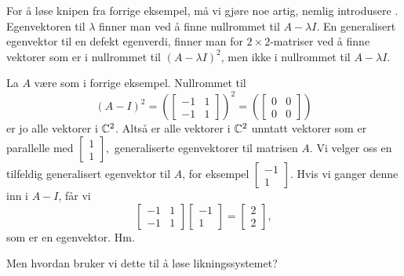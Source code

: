 For å løse knipen fra forrige eksempel, må vi gjøre noe artig, nemlig introdusere . 
Egenvektoren til $\lambda$ finner man ved å finne nullrommet til $A-\lambda I$. 
En generalisert egenvektor til en defekt egenverdi, finner man for $2 \times 2$-matriser ved å finne vektorer som er i nullrommet til $(A-\lambda I)^2$, 
men ikke i nullrommet til $A-\lambda I$.

\begin{ex}
La $A$ være som i forrige eksempel. Nullrommet til 
\[
(A-I)^2=
\left(\begin{bmatrix}
-1 & 1   \\
-1 & 1
\end{bmatrix}\right)^2=
\left(\begin{bmatrix}
0 & 0   \\
0 & 0
\end{bmatrix}\right)
\]
er jo alle vektorer i $\mathbb{C}^2$. Altså er alle vektorer i $\mathbb{C}^2$ unntatt vektorer som er parallelle med 
$
\begin{bmatrix}
1  \\
1 
\end{bmatrix},
$
generaliserte egenvektorer til matrisen $A$.
Vi velger oss en tilfeldig generalisert egenvektor til $A$, for eksempel
$
\begin{bmatrix}
-1  \\
1 
\end{bmatrix}.
$
Hvis vi ganger denne inn i $A-I$, får vi 
\[
\begin{bmatrix}
-1 & 1   \\
-1 & 1
\end{bmatrix}
\begin{bmatrix}
-1    \\
 1
\end{bmatrix}
=
\begin{bmatrix}
2    \\
2
\end{bmatrix},
\]
som er en egenvektor. Hm.
\end{ex}

Men hvordan bruker vi dette til å løse likningssystemet? 

